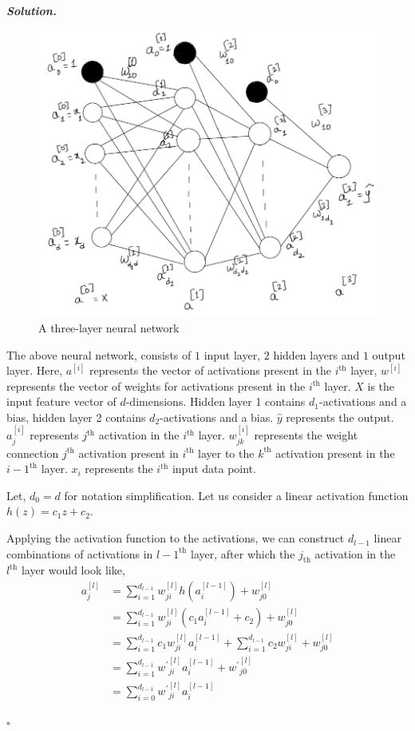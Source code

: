 \documentclass[10pt]{article}
\newenvironment{solution}[1][\it{Solution}]{\textbf{#1. } }{$\square$}
\begin{document}
\begin{solution}
\begin{figure}[H]
\includegraphics[width=16cm, keepaspectratio]{NeuralNetwork}
\caption{A three-layer neural network}
\end{figure}

The above neural network, consists of $1$ input layer, $2$ hidden layers and $1$ output layer. Here, $a^{[i]}$ represents the vector of activations present in the $i^{\text{th}}$ layer, $w^{[i]}$ represents the vector of weights for activations present in the $i^{\text{th}}$ layer. $X$ is the input feature vector of $d$-dimensions. Hidden layer 1 contains $d_1$-activations and a bias, hidden layer 2 contains $d_2$-activations and a bias. $\hat{y}$ represents the output. $a^{[i]}_{j}$ represents $j^{\text{th}}$ activation in the $i^{\text{th}}$ layer. $w^{[i]}_{jk}$ represents the weight connection $j^{\text{th}}$ activation present in $i^{\text{th}}$ layer to the $k^{\text{th}}$ activation present in the $i-1^{\text{th}}$ layer. $x_i$ represents the $i^{\text{th}}$ input data point.

Let, $d_0 = d$ for notation simplification. Let us consider a linear activation function $h(z) = c_1z +c_2$.

Applying the activation function to the activations, we can construct $d_{l-1}$ linear combinations of activations in $l-1^{\text{th}}$ layer, after which the $j_{\text{th}}$ activation in the $l^{\text{th}}$ layer would look like,
\begin{align*}
a^{[l]}_{j} &= \sum_{i = 1}^{d_{l-1}} w^{[l]}_{ji}h\left(a^{[l-1]}_{i}\right) + w^{[l]}_{j0}\\
			  &= \sum_{i = 1}^{d_{l-1}} w^{[l]}_{ji}\left(c_1a^{[l-1]}_{i}+c_2\right) + w^{[l]}_{j0}\\
			  &= \sum_{i = 1}^{d_{l-1}} c_1w^{[l]}_{ji}a^{[l-1]}_{i}+\sum_{i = 1}^{d_{l-1}}c_2 w^{[l]}_{ji} + w^{[l]}_{j0}\\
			  &= \sum_{i = 1}^{d_{l-1}} {w^{'}}^{[l]}_{ji}a^{[l-1]}_{i} + {w^{'}}^{[l]}_{j0}\\
			  &= \sum_{i = 0}^{d_{l-1}} {w^{'}}^{[l]}_{ji}a^{[l-1]}_{i}
\end{align*}


\end{solution}
\end{document}
